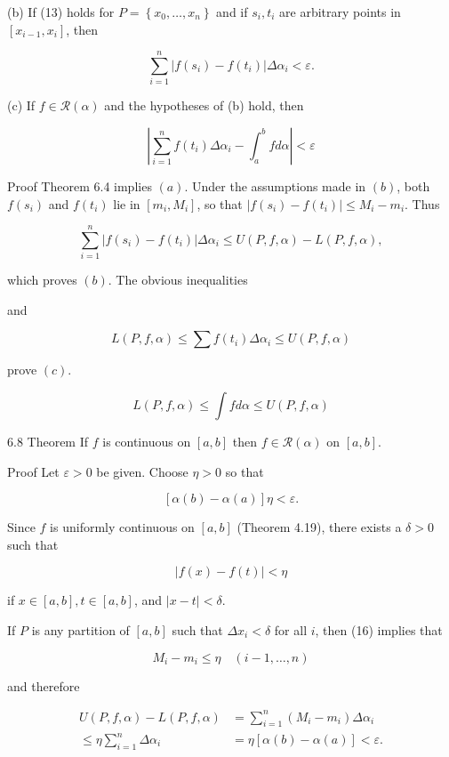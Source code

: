 \documentclass[10pt]{article}
\begin{document}
(b) If (13) holds for $P=\left\{x_{0}, \ldots, x_{n}\right\}$ and if $s_{i}, t_{i}$ are arbitrary points in $\left[x_{i-1}, x_{i}\right]$, then

$$
\sum_{i=1}^{n}\left|f\left(s_{i}\right)-f\left(t_{i}\right)\right| \Delta \alpha_{i}<\varepsilon .
$$

(c) If $f \in \mathscr{R}(\alpha)$ and the hypotheses of (b) hold, then

$$
\left|\sum_{i=1}^{n} f\left(t_{i}\right) \Delta \alpha_{i}-\int_{a}^{b} f d \alpha\right|<\varepsilon
$$

Proof Theorem 6.4 implies $(a)$. Under the assumptions made in $(b)$, both $f\left(s_{i}\right)$ and $f\left(t_{i}\right)$ lie in $\left[m_{i}, M_{i}\right]$, so that $\left|f\left(s_{i}\right)-f\left(t_{i}\right)\right| \leq M_{i}-m_{i}$. Thus

$$
\sum_{i=1}^{n}\left|f\left(s_{i}\right)-f\left(t_{i}\right)\right| \Delta \alpha_{i} \leq U(P, f, \alpha)-L(P, f, \alpha),
$$

which proves $(b)$. The obvious inequalities

and

$$
L(P, f, \alpha) \leq \sum f\left(t_{i}\right) \Delta \alpha_{i} \leq U(P, f, \alpha)
$$

prove $(c)$.

$$
L(P, f, \alpha) \leq \int f d \alpha \leq U(P, f, \alpha)
$$

6.8 Theorem If $f$ is continuous on $[a, b]$ then $f \in \mathscr{R}(\alpha)$ on $[a, b]$.

Proof Let $\varepsilon>0$ be given. Choose $\eta>0$ so that

$$
[\alpha(b)-\alpha(a)] \eta<\varepsilon .
$$

Since $f$ is uniformly continuous on $[a, b]$ (Theorem 4.19), there exists a $\delta>0$ such that

$$
|f(x)-f(t)|<\eta
$$

if $x \in[a, b], t \in[a, b]$, and $|x-t|<\delta$.

If $P$ is any partition of $[a, b]$ such that $\Delta x_{i}<\delta$ for all $i$, then (16) implies that

$$
M_{i}-m_{i} \leq \eta \quad(i-1, \ldots, n)
$$

and therefore

$$
\begin{aligned}
U(P, f, \alpha)-L(P, f, \alpha) & =\sum_{i=1}^{n}\left(M_{i}-m_{i}\right) \Delta \alpha_{i} \\
\leq \eta \sum_{i=1}^{n} \Delta \alpha_{i} & =\eta[\alpha(b)-\alpha(a)]<\varepsilon .
\end{aligned}
$$
\end{document}
